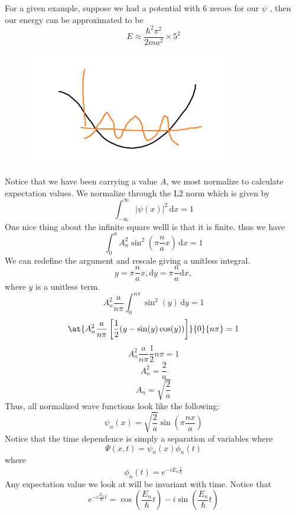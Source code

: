 \begin{eg}
    For a given example, suppose we had a potential with 6 zeroes for our \(\psi \) , then our energy can be approximated to be 
    \[
        E \approx \frac{\hbar ^{2}  \pi ^{2} }{2ma^{2}} \times 5^{2} 
    \]
    \begin{figure}[H]
        \centering
        \includegraphics[width=0.8\textwidth]{Figures/01.png}
        \caption{}
        \label{fig:}
    \end{figure}
\end{eg}
\begin{remark}
    
Notice that we have been carrying a value \(A\), we most normalize to calculate expectation values. We normalize through 
the L2 norm which is given by 
\[
    \int_{-\infty}^{\infty} \vert \psi (x) \vert  ^{2} \,\mathrm{d}x  = 1 
\]
One nice thing about the infinite square welll is that it is finite. thus we have 
\[
    \int_{0}^{a}  A_n ^{2}  \sin ^{2} (\pi \frac{n}{a} x)\,\mathrm{d}x = 1
\]
We can redefine the argument and rescale giving a unitless integral. 
\[
    y= \pi \frac{n}{a} x, \mathrm{d}y  = \pi \frac{n}{a}\mathrm{d}x , 
\]
where \(y\) is a unitless term.  
\[
    A_n ^{2}  \frac{a}{n \pi } \int_{0}^{n \pi } \sin ^{2} (y)  \,\mathrm{d}y  = 1 
\]
\[
  \at{  A_n ^{2}  \frac{a}{n \pi } \left[  \frac{1}{2} (y-\sin (y)\cos (y))\right]}{0}{n \pi } = 1
\]
\[
    A_n ^{2}  \frac{a}{n \pi } \frac{1}{2} n \pi  = 1
\]
\[
    A_n ^{2}  = \frac{2}{a}
\]
\[
    A_n = \sqrt{\frac{2}{a}} 
\]
Thus, all normalized wave functions look like the following:
\[
    \psi _n (x) = \sqrt{\frac{2}{a}} \sin (\pi \frac{nx}{a})
\]
Notice that the time dependence is simply a separation of variables where 
\[
    \Psi (x,t) = \psi_n (x) \phi_n  (t)
\]
where 
\[
\phi _n (t) = e^{-iE_{n}\frac{t}{\hbar } } 
\]
Any expectation value we look at will be invariant with time. Notice that 
\[
    e^{-i\frac{E_n}{\hbar }t} = \cos (\frac{E_n}{\hbar }t) - i \sin (\frac{E_n}{\hbar }t) 
\]

\end{remark}

